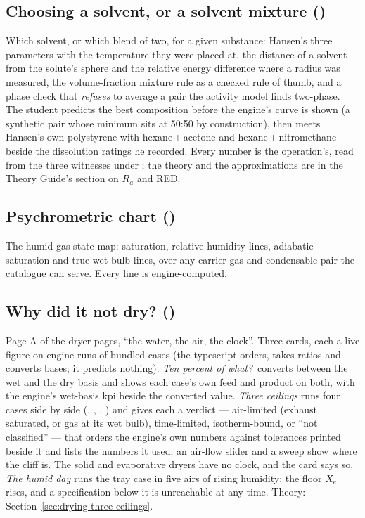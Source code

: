 \documentclass[11pt,a4paper]{article}
\begin{document}
\subsection*{Choosing a solvent, or a solvent mixture \quad()}
Which solvent, or which blend of two, for a given substance: Hansen's three
parameters with the temperature they were placed at, the distance of a
solvent from the solute's sphere and the relative energy difference where a
radius was measured, the volume-fraction mixture rule as a checked rule of
thumb, and a phase check that \emph{refuses} to average a pair the activity
model finds two-phase.  The student predicts the best composition before
the engine's curve is shown (a synthetic pair whose minimum sits at 50:50 by
construction), then meets Hansen's own polystyrene with hexane\,+\,acetone
and hexane\,+\,nitromethane beside the dissolution ratings he recorded.
Every number is the  operation's, read from the three
witnesses under ; the theory and the
approximations are in the Theory Guide's section on $R_a$ and RED.

\subsection*{Psychrometric chart \quad()}
The humid-gas state map: saturation, relative-humidity lines,
adiabatic-saturation and true wet-bulb lines, over any carrier gas and
condensable pair the catalogue can serve.  Every line is engine-computed.

\subsection*{Why did it not dry? \quad()}\label{sec:edu-why-did-it-not-dry}
Page A of the dryer pages, ``the water, the air, the clock''.  Three cards, each a live figure on engine runs of
bundled cases (the typescript orders, takes ratios and converts bases; it predicts nothing).  \emph{Ten percent of
what?}\ converts between the wet and the dry basis and shows each case's own feed and product on both, with the
engine's wet-basis kpi beside the converted value.  \emph{Three ceilings} runs four cases side by side
(, , ,
) and gives each a verdict --- air-limited (exhaust saturated, or gas at its wet bulb),
time-limited, isotherm-bound, or ``not classified'' --- that orders the engine's own numbers against tolerances
printed beside it and lists the numbers it used; an air-flow slider and a sweep show where the cliff is.  The solid
and evaporative dryers have no clock, and the card says so.  \emph{The humid day} runs the tray case in five airs of
rising humidity: the floor $X_e$ rises, and a specification below it is unreachable at any time.  Theory: Section~\ref{sec:drying-three-ceilings}.
\end{document}
